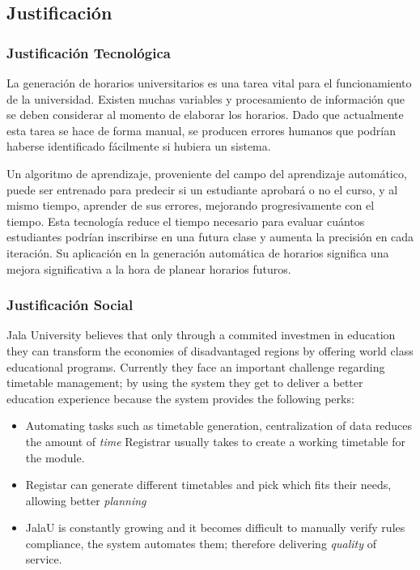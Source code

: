 \subsection{Justificación}

\subsubsection{Justificación Tecnológica}
La generación de horarios universitarios es una tarea vital para el funcionamiento de la universidad.
Existen muchas variables y procesamiento de información que se deben considerar al momento de elaborar los horarios. Dado que actualmente esta tarea se hace de forma manual, se producen errores humanos que podrían haberse identificado fácilmente si hubiera un sistema.

Un algoritmo de aprendizaje, proveniente del campo del aprendizaje automático, puede ser entrenado para predecir si un estudiante aprobará o no el curso, y al mismo tiempo, aprender de sus errores, mejorando progresivamente con el tiempo.
Esta tecnología reduce el tiempo necesario para evaluar cuántos estudiantes podrían inscribirse en una futura clase y aumenta la precisión en cada iteración. Su aplicación en la generación automática de horarios significa una mejora significativa a la hora de planear horarios futuros.

\subsubsection{Justificación Social}
Jala University believes that only through a commited investmen in education they can transform the economies of disadvantaged regions by offering world class educational programs.
Currently they face an important challenge regarding timetable management; by using the system they get to deliver a better education experience because the system provides the following perks:

\begin{itemize}
    \item Automating tasks such as timetable generation, centralization of data reduces the amount of \textit{time} Registrar usually takes to create a working timetable for the module.
    \item Registar can generate different timetables and pick which fits their needs, allowing better \textit{planning}
    \item JalaU is constantly growing and it becomes difficult to manually verify rules compliance, the system automates them; therefore delivering \textit{quality} of service.
\end{itemize}

